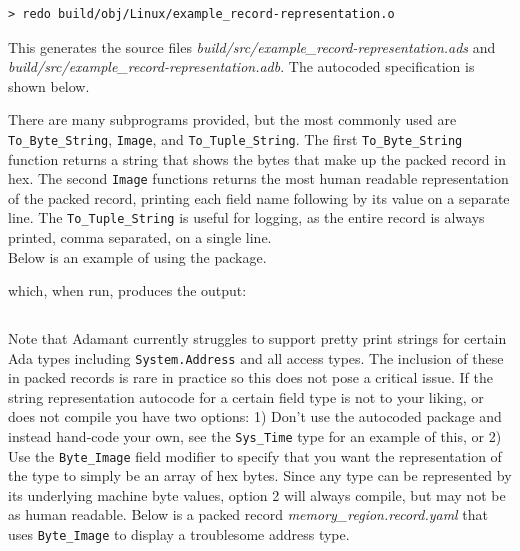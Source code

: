 \vspace{5mm} %
\begin{verbatim}
> redo build/obj/Linux/example_record-representation.o
\end{verbatim}
\vspace{5mm} %

This generates the source files \textit{build/src/example\_record-representation.ads} and \textit{build/src/example\_record-representation.adb}. The autocoded specification is shown below.


There are many subprograms provided, but the most commonly used are \texttt{To\_Byte\_String}, \texttt{Image}, and \texttt{To\_Tuple\_String}. The first \texttt{To\_Byte\_String} function returns a string that shows the bytes that make up the packed record in hex. The second \texttt{Image} functions returns the most human readable representation of the packed record, printing each field name following by its value on a separate line. The \texttt{To\_Tuple\_String} is useful for logging, as the entire record is always printed, comma separated, on a single line. \\

Below is an example of using the package.


which, when run, produces the output:

\vspace{5mm} %
\inputminted{text}{../example_architecture/record_representation/output.txt}
\vspace{5mm} %

Note that Adamant currently struggles to support pretty print strings for certain Ada types including \texttt{System.Address} and all access types. The inclusion of these in packed records is rare in practice so this does not pose a critical issue. If the string representation autocode for a certain field type is not to your liking, or does not compile you have two options: 1) Don't use the autocoded package and instead hand-code your own, see the \texttt{Sys\_Time} type for an example of this, or 2) Use the \texttt{Byte\_Image} field modifier to specify that you want the representation of the type to simply be an array of hex bytes. Since any type can be represented by its underlying machine byte values, option 2 will always compile, but may not be as human readable. Below is a packed record \textit{memory\_region.record.yaml} that uses \texttt{Byte\_Image} to display a troublesome address type.

